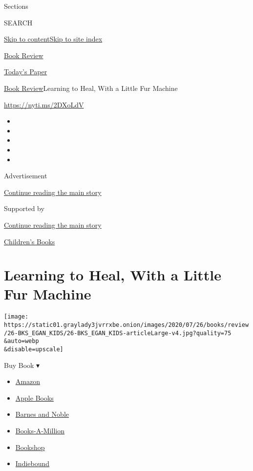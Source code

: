Sections

SEARCH

\protect\hyperlink{site-content}{Skip to
content}\protect\hyperlink{site-index}{Skip to site index}

\href{https://www.nytimes3xbfgragh.onion/section/books/review}{Book
Review}

\href{https://myaccount.nytimes3xbfgragh.onion/auth/login?response_type=cookie\&client_id=vi}{}

\href{https://www.nytimes3xbfgragh.onion/section/todayspaper}{Today's
Paper}

\href{/section/books/review}{Book Review}\textbar{}Learning to Heal,
With a Little Fur Machine

\url{https://nyti.ms/2DXoLdV}

\begin{itemize}
\item
\item
\item
\item
\item
\end{itemize}

Advertisement

\protect\hyperlink{after-top}{Continue reading the main story}

Supported by

\protect\hyperlink{after-sponsor}{Continue reading the main story}

\href{/column/childrens-books}{Children's Books}

\hypertarget{learning-to-heal-with-a-little-fur-machine}{%
\section{Learning to Heal, With a Little Fur
Machine}\label{learning-to-heal-with-a-little-fur-machine}}

\texttt{[image: https://static01.graylady3jvrrxbe.onion/images/2020/07/26/books/review/26-BKS\_EGAN\_KIDS/26-BKS\_EGAN\_KIDS-articleLarge-v4.jpg?quality=75\\\&auto=webp\\\&disable=upscale]}

Buy Book ▾

\begin{itemize}
\tightlist
\item
  \href{https://www.amazon.com/gp/search?index=books\&tag=NYTBSREV-20\&field-keywords=Raising+Lumie+Joan+Bauer}{Amazon}
\item
  \href{https://du-gae-books-dot-nyt-du-prd.appspot.com/buy?title=Raising+Lumie\&author=Joan+Bauer}{Apple
  Books}
\item
  \href{https://www.anrdoezrs.net/click-7990613-11819508?url=https\%3A\%2F\%2Fwww.barnesandnoble.com\%2Fw\%2F\%3Fean\%3D9780593113202}{Barnes
  and Noble}
\item
  \href{https://www.anrdoezrs.net/click-7990613-35140?url=https\%3A\%2F\%2Fwww.booksamillion.com\%2Fp\%2FRaising\%2BLumie\%2FJoan\%2BBauer\%2F9780593113202}{Books-A-Million}
\item
  \href{https://bookshop.org/a/3546/9780593113202}{Bookshop}
\item
  \href{https://www.indiebound.org/book/9780593113202?aff=NYT}{Indiebound}
\end{itemize}

